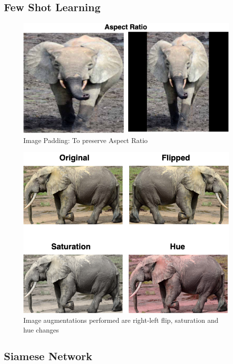 \documentclass[10pt,twocolumn,letterpaper]{article}
\begin{document}
\subsection{Few Shot Learning}

\begin{figure}[t]
  \centering
  \includegraphics[scale=0.23]{image_padding}
   \caption{Image Padding: To preserve Aspect Ratio}
   \label{fig:image_padding}
\end{figure}

\begin{figure}[t]
  \centering
  \includegraphics[scale=0.37]{augmentation}
   \caption{Image augmentations performed are right-left flip, saturation and hue changes}
   \label{fig:augmentation}
\end{figure}



\subsection{Siamese Network}
\end{document}
